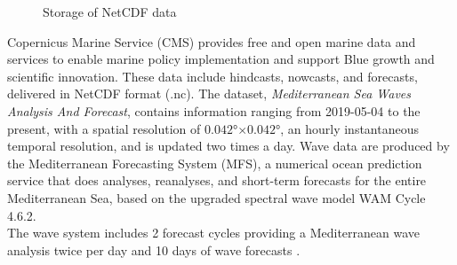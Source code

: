 \begin{figure}[h]
	\centering 
	\hspace{0.5cm}
	\caption{Storage of NetCDF data} 
	\label{netcdf}
\end{figure}
Copernicus Marine Service (CMS) provides free and open marine data and services to enable marine policy implementation and support Blue growth and scientific innovation. These data include hindcasts, nowcasts, and forecasts, delivered in NetCDF format (.nc).
The dataset, \textit{Mediterranean Sea Waves Analysis And Forecast}, contains information ranging from 2019-05-04 to the present, with a spatial resolution of $0.042$°$\times0.042$°, an hourly instantaneous temporal resolution, and is updated two times a day.
Wave data are produced by the Mediterranean Forecasting System (MFS), a numerical ocean prediction service that does analyses, reanalyses, and short-term forecasts for the entire Mediterranean Sea, based on the upgraded spectral wave model WAM Cycle 4.6.2. \\
The wave system includes 2 forecast cycles providing a Mediterranean wave analysis twice per day and 10 days of wave forecasts \cite{copernicus}.
